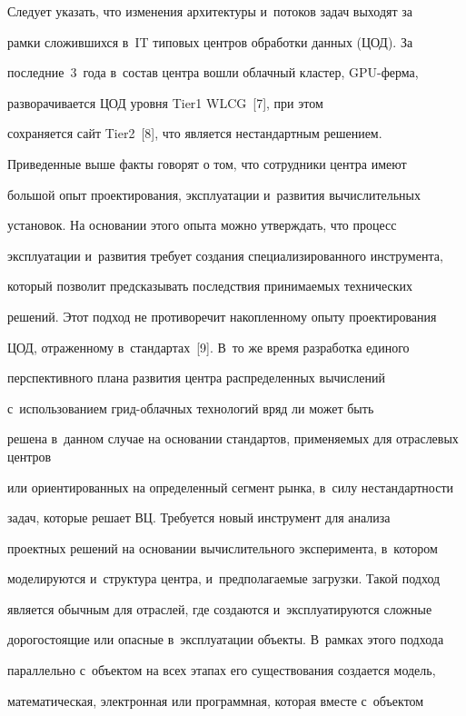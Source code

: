   Следует указать, что изменения архитектуры и~потоков задач выходят за


рамки сложившихся в~IT типовых центров обработки данных (ЦОД). За


последние~3~года в~состав центра вошли облачный кластер, GPU-фер\-ма,


разворачивается ЦОД уровня Tier1 WLCG~[7], при этом


сохраняется сайт Tier2~[8], что является нестандартным решением.





  Приведенные выше факты говорят о том, что сотрудники центра имеют


большой опыт проектирования, эксплуатации и~развития вычислительных


установок. На основании этого опыта можно утверждать, что процесс


эксплуатации и~развития требует создания специализированного инструмента,


который позволит предсказывать последствия принимаемых технических


решений. Этот подход не противоречит накопленному опыту проектирования


ЦОД, отраженному в~стандартах~[9]. В~то же время разработка единого


перспективного плана развития центра распределенных вычислений


с~использованием грид-об\-лач\-ных технологий вряд ли может быть


решена в~данном случае на основании стандартов, применяемых для отраслевых центров


или ориентированных на определенный сегмент рынка, в~силу нестандартности


задач, которые решает ВЦ. Требуется новый инструмент для анализа


проектных решений на основании вычислительного эксперимента, в~котором


моделируются и~структура центра, и~предполагаемые загрузки. Такой подход


является обычным для отраслей, где создаются и~эксплуатируются сложные


дорогостоящие или опасные в~эксплуатации объекты. В~рамках этого подхода


параллельно с~объектом на всех этапах его существования создается модель,


математическая, электронная или программная, которая вместе с~объектом


